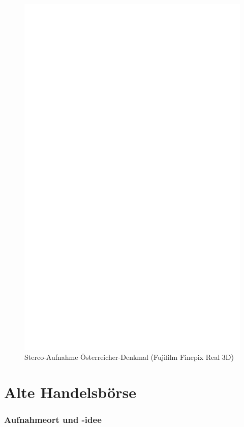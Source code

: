 \documentclass[liststotoc,bibtotoc,fontsize=14pt,]{scrreprt}
\begin{document}
\newpage
\begin{figure}[h]
	\includegraphics[width=\linewidth]{img/ph.jpg}
	\caption{Stereo-Aufnahme Österreicher-Denkmal (Fujifilm Finepix Real 3D)}
\end{figure}
	
	\section{Alte Handelsbörse}
	\label{sec:wagner}
	\subsubsection{Aufnahmeort und -idee}
		
\end{document}
